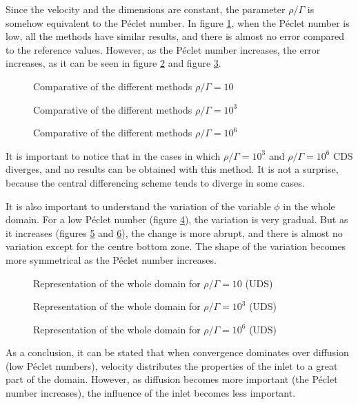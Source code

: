 Since the velocity and the dimensions are constant, the parameter $\rho/\Gamma$ is somehow equivalent to the Péclet number. In figure \ref{ResSH10}, when the Péclet number is low, all the methods have similar results, and there is almost no error compared to the reference values. However, as the Péclet number increases, the error increases, as it can be seen in figure \ref{ResSH1000} and figure \ref{ResSH1000000}.

\begin{figure}[h]
	\centering
	
	\caption{Comparative of the different methods $\rho/\Gamma=10$}
	\label{ResSH10}
\end{figure}
\begin{figure}[h]
	\centering
	
	\caption{Comparative of the different methods $\rho/\Gamma=10^{3}$}
	\label{ResSH1000}
\end{figure}
\begin{figure}[h]
	\centering
	
	\caption{Comparative of the different methods $\rho/\Gamma=10^{6}$}
	\label{ResSH1000000}
\end{figure}
It is important to notice that in the cases in which $\rho/\Gamma=10^{3}$ and $\rho/\Gamma=10^{6}$ CDS diverges, and no results can be obtained with this method. It is not a surprise, because the central differencing scheme tends to diverge in some cases.

It is also important to understand the variation of the variable $\phi$ in the whole domain. For a low Péclet number (figure \ref{ResuSH10}), the variation is very gradual. But as it increases (figures \ref{ResuSH1000} and \ref{ResuSH1000000}), the change is more abrupt, and there is almost no variation except for the centre bottom zone. The shape of the variation becomes more symmetrical as the Péclet number increases.
\begin{figure}[h]
	\centering
	
	\caption{Representation of the whole domain for $\rho/\Gamma=10$ (UDS)}
	\label{ResuSH10}
\end{figure}
\begin{figure}[h]
	\centering
	
	\caption{Representation of the whole domain for $\rho/\Gamma=10^{3}$ (UDS)}
	\label{ResuSH1000}
\end{figure}
\begin{figure}[h]
	\centering
	
	\caption{Representation of the whole domain for $\rho/\Gamma=10^{6}$ (UDS)}
	\label{ResuSH1000000}
\end{figure}

As a conclusion, it can be stated that when convergence dominates over diffusion (low Péclet numbers), velocity distributes the properties of the inlet to a great part of the domain. However, as diffusion becomes more important (the Péclet number increases), the influence of the inlet becomes less important.